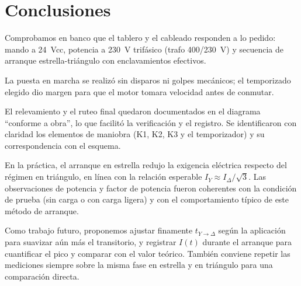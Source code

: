 \section{Conclusiones}
Comprobamos en banco que el tablero y el cableado responden a lo pedido: mando a 24~Vcc, potencia a 230~V trifásico (trafo 400/230~V) y secuencia de arranque estrella-triángulo con enclavamientos efectivos.

La puesta en marcha se realizó sin disparos ni golpes mecánicos; el temporizado elegido dio margen para que el motor tomara velocidad antes de conmutar.

El relevamiento y el ruteo final quedaron documentados en el diagrama ``conforme a obra'', lo que facilitó la verificación y el registro. Se identificaron con claridad los elementos de maniobra (K1, K2, K3 y el temporizador) y su correspondencia con el esquema.

En la práctica, el arranque en estrella redujo la exigencia eléctrica respecto del régimen en triángulo, en línea con la relación esperable $I_Y \approx I_\Delta/\sqrt{3}$. Las observaciones de potencia y factor de potencia fueron coherentes con la condición de prueba (sin carga o con carga ligera) y con el comportamiento típico de este método de arranque.

Como trabajo futuro, proponemos ajustar finamente $t_{Y\to\Delta}$ según la aplicación para suavizar aún más el transitorio, y registrar $I(t)$ durante el arranque para cuantificar el pico y comparar con el valor teórico. También conviene repetir las mediciones siempre sobre la misma fase en estrella y en triángulo para una comparación directa.
